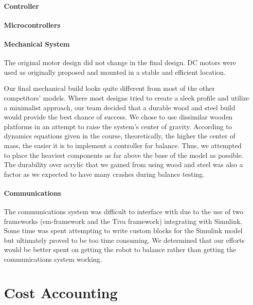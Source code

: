\documentclass[11pt]{report}
\begin{document}
\begin{spacing}{1.5}
        \paragraph{Controller}
        
        \paragraph{Microcontrollers}
        
        \paragraph{Mechanical System}
        
        The original motor design did not change in the final design. DC motors were used as originally proposed and mounted in a stable and efficient location.
        
        Our final mechanical build looks quite different from most of the other competitors’ models. Where most designs tried to create a sleek profile and utilize a minimalist approach, our team decided that a durable wood and steel build would provide the best chance of success. We chose to use dissimilar wooden platforms in an attempt to raise the system’s center of gravity. According to dynamics equations given in the course, theoretically, the higher the center of mass, the easier it is to implement a controller for balance. Thus, we attempted to place the heaviest components as far above the base of the model as possible. The durability over acrylic that we gained from using wood and steel was also a factor as we expected to have many crashes during balance testing.
        
        \paragraph{Communications}
        
        The communications system was difficult to interface with due to the use of two frameworks (em-framework and the Tiva framework) integrating with Simulink. Some time was spent attempting to write custom blocks for the Simulink model but ultimately proved to be too time consuming. We determined that our efforts would be better spent on getting the robot to balance rather than getting the communications system working.

\section*{Cost Accounting}


\end{spacing}
\end{document}
